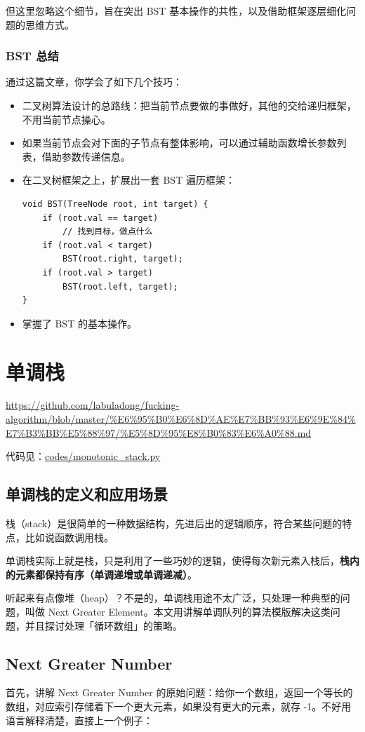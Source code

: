 \documentclass[12pt]{article}
\begin{document}
但这里忽略这个细节，旨在突出 BST 基本操作的共性，以及借助框架逐层细化问题的思维方式。

\subsubsection{BST 总结}
通过这篇文章，你学会了如下几个技巧：
\begin{itemize}
\setlength{\itemsep}{0pt}
\setlength{\parsep}{0pt}
\setlength{\parskip}{0pt}
    \item 二叉树算法设计的总路线：把当前节点要做的事做好，其他的交给递归框架，不用当前节点操心。
    \item 如果当前节点会对下面的子节点有整体影响，可以通过辅助函数增长参数列表，借助参数传递信息。
    \item 在二叉树框架之上，扩展出一套 BST 遍历框架：
    \begin{lstlisting}
void BST(TreeNode root, int target) {
    if (root.val == target)
        // 找到目标，做点什么
    if (root.val < target) 
        BST(root.right, target);
    if (root.val > target)
        BST(root.left, target);
}
\end{lstlisting}
    \item 掌握了 BST 的基本操作。
\end{itemize}

\section{单调栈}
\url{https://github.com/labuladong/fucking-algorithm/blob/master/%E6%95%B0%E6%8D%AE%E7%BB%93%E6%9E%84%E7%B3%BB%E5%88%97/%E5%8D%95%E8%B0%83%E6%A0%88.md}

代码见：\url{codes/monotonic_stack.py}

\subsection{单调栈的定义和应用场景}
栈（stack）是很简单的一种数据结构，先进后出的逻辑顺序，符合某些问题的特点，比如说函数调用栈。

单调栈实际上就是栈，只是利用了一些巧妙的逻辑，使得每次新元素入栈后，\textbf{栈内的元素都保持有序（单调递增或单调递减）}。

听起来有点像堆（heap）？不是的，单调栈用途不太广泛，只处理一种典型的问题，叫做 Next Greater Element。本文用讲解单调队列的算法模版解决这类问题，并且探讨处理「循环数组」的策略。

\subsection{Next Greater Number}
首先，讲解 Next Greater Number 的原始问题：给你一个数组，返回一个等长的数组，对应索引存储着下一个更大元素，如果没有更大的元素，就存 -1。不好用语言解释清楚，直接上一个例子：
\end{document}
